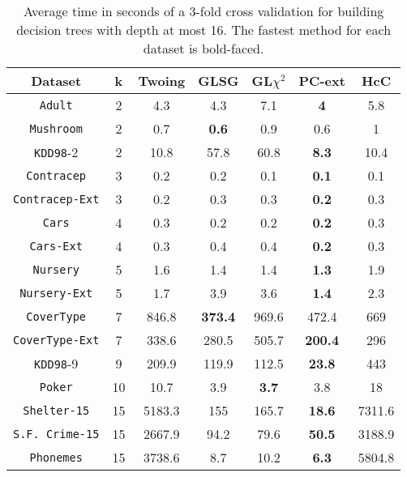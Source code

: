 \begin{table}[]
\small
\centering
\begin{tabular}{c|c|c|c|c|c|c}
Dataset             & k  & Twoing        & GLSG      & GL$\chi^2$  & PC-ext    & HcC     \\ \hline
{\tt Adult}         & 2  & 4.3           & 4.3       & 7.1         &{\bf 4}    & 5.8     \\
{\tt Mushroom}      & 2  & 0.7           & {\bf 0.6} & 0.9         & 0.6       & 1       \\
{\tt KDD98}-2       & 2  & 10.8          & 57.8      & 60.8        &{\bf 8.3}  & 10.4    \\
{\tt Contracep}     & 3  & 0.2           & 0.2       & 0.1         &{\bf 0.1}  & 0.1     \\
{\tt Contracep-Ext} & 3  & 0.2           & 0.3       & 0.3         &{\bf 0.2}  & 0.3     \\
{\tt Cars}          & 4  & 0.3           & 0.2       & 0.2         &{\bf 0.2}  & 0.3    \\
{\tt Cars-Ext}      & 4  & 0.3           & 0.4       & 0.4         &{\bf 0.2}  & 0.3    \\
{\tt Nursery}       & 5  & 1.6           & 1.4       & 1.4         &{\bf 1.3}  & 1.9    \\
{\tt Nursery-Ext}   & 5  & 1.7           & 3.9       & 3.6         &{\bf 1.4}  & 2.3    \\
{\tt CoverType}     & 7  & 846.8         &{\bf 373.4}& 969.6       & 472.4     & 669    \\
{\tt CoverType-Ext} & 7  & 338.6         & 280.5     & 505.7       &{\bf 200.4}& 296    \\
{\tt KDD98}-9       & 9  & 209.9         & 119.9     & 112.5       &{\bf 23.8} & 443    \\
{\tt Poker}         & 10 & 10.7          & 3.9       & {\bf 3.7}   & 3.8       & 18     \\
{\tt Shelter-15}    & 15 & 5183.3        & 155       & 165.7       &{\bf 18.6} & 7311.6 \\
{\tt S.F. Crime-15} & 15 & 2667.9        & 94.2      & 79.6        &{\bf 50.5} & 3188.9 \\
{\tt Phonemes}      & 15 & 3738.6        & 8.7       & 10.2        &{\bf 6.3}  & 5804.8
\end{tabular}
\caption{Average time in seconds of a 3-fold cross validation
for building decision trees with depth at most 16.
The fastest method for each dataset is bold-faced.}
\label{tab:time-16}
\end{table}


